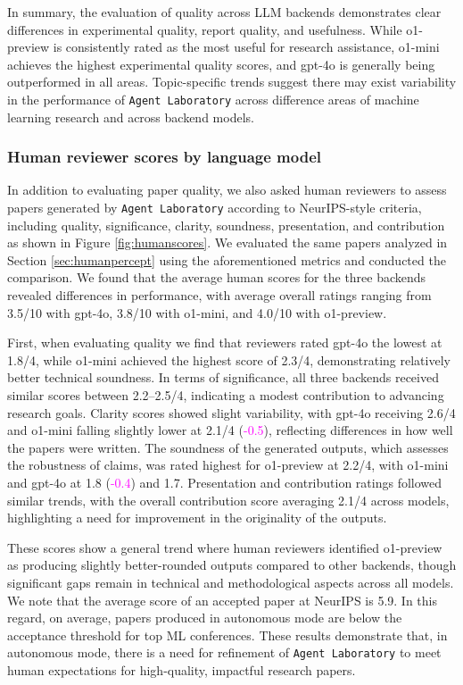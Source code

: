 \documentclass[11pt, a4paper]{gdm_format}
\begin{document}
In summary, the evaluation of quality across LLM backends demonstrates clear differences in experimental quality, report quality, and usefulness. While o1-preview is consistently rated as the most useful for research assistance, o1-mini achieves the highest experimental quality scores, and gpt-4o is generally being outperformed in all areas. Topic-specific trends suggest there may exist variability in the performance of \texttt{Agent Laboratory} across difference areas of machine learning research and across backend models.





\subsubsection{Human reviewer scores by language model}
\label{sec:humanrevscores}


In addition to evaluating paper quality, we also asked human reviewers to assess papers generated by \texttt{Agent Laboratory} according to NeurIPS-style criteria, including quality, significance, clarity, soundness, presentation, and contribution as shown in Figure \ref{fig:humanscores}. We evaluated the same papers analyzed in Section \ref{sec:humanpercept} using the aforementioned metrics and conducted the comparison. We found that the average human scores for the three backends revealed differences in performance, with average overall ratings ranging from 3.5/10 with gpt-4o, 3.8/10 with o1-mini, and 4.0/10 with o1-preview.

First, when evaluating quality we find that reviewers rated gpt-4o the lowest at 1.8/4, while o1-mini achieved the highest score of 2.3/4, demonstrating relatively better technical soundness. In terms of significance, all three backends received similar scores between 2.2–2.5/4, indicating a modest contribution to advancing research goals. Clarity scores showed slight variability, with gpt-4o receiving 2.6/4 and o1-mini falling slightly lower at 2.1/4 (\textcolor{Magenta}{-0.5}), reflecting differences in how well the papers were written.
The soundness of the generated outputs, which assesses the robustness of claims, was rated highest for o1-preview at 2.2/4, with o1-mini and gpt-4o at 1.8 (\textcolor{Magenta}{-0.4}) and 1.7. Presentation and contribution ratings followed similar trends, with the overall contribution score averaging 2.1/4 across models, highlighting a need for improvement in the originality of the outputs.

These scores show a general trend where human reviewers identified o1-preview as producing slightly better-rounded outputs compared to other backends, though significant gaps remain in technical and methodological aspects across all models. We note that the average score of an accepted paper at NeurIPS is 5.9. In this regard, on average, papers produced in autonomous mode are below the acceptance threshold for top ML conferences. These results demonstrate that, in autonomous mode, there is a need for refinement of \texttt{Agent Laboratory} to meet human expectations for high-quality, impactful research papers.
\end{document}
